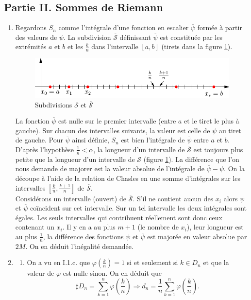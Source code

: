 \subsection*{Partie II. Sommes de Riemann}
\begin{enumerate}
 \item Regardons $S_n$ comme l'intégrale d'une fonction en escalier $\overline{\psi}$ formée à partir des valeurs de $\psi$. La subdivision $\overline{\mathcal S}$ définissant $\overline{\psi}$  est constituée par les extrémités $a$ et $b$ et les $\frac{k}{n}$ dans l'intervalle $[a,b]$ (tirets dans la figure \ref{fig:Cfesc1_2}).\newline
 \begin{figure}[h]
 \centering
 \includegraphics{Cfesc1_2.pdf}
 \caption{Subdivisions $\mathcal S$ et $\overline{\mathcal S}$}
 \label{fig:Cfesc1_2}
\end{figure}
La fonction $\overline{\psi}$ est nulle sur le premier intervalle (entre $a$ et le tiret le plus à gauche). Sur chacun des intervalles suivants, la valeur est celle de $\psi$ au tiret de gauche. Pour $\overline{\psi}$ ainsi définie, $S_n$ est bien l'intégrale de $\overline{\psi}$ entre $a$ et $b$.\newline 
D'après l'hypothèse $\frac{1}{n}<\alpha$, la longueur d'un intervalle de $\overline{\mathcal S}$ est toujours plus petite que la longueur d'un intervalle de $\mathcal S$ (figure \ref{fig:Cfesc1_2}).
La différence que l'on nous demande de majorer est la valeur absolue de l'intégrale de $\overline{\psi}-\psi$. On la découpe à l'aide de la relation de Chasles en une somme d'intégrales sur les intervalles $[\frac{k}{n},\frac{k+1}{n}]$ de $\overline{\mathcal S}$.\\ 
Considérons un intervalle (ouvert) de $\overline{\mathcal S}$.\newline
S'il ne contient aucun des $x_i$ alors $\psi$ et $\overline{\psi}$ coïncident sur cet intervalle. Sur un tel intervalle les deux intégrales sont égales.\newline
Les seuls intervalles qui contribuent réellement sont donc ceux contenant un $x_i$. Il y en a au plus $m+1$ (le nombre de $x_i$), leur longueur est au plus $\frac{1}{n}$, la différence des fonctions $\psi$ et $\overline{\psi}$ est majorée en valeur absolue par $2M$. On en déduit l'inégalité demandée.
 \item
\begin{enumerate}
 \item On a vu en I.1.c. que $\varphi(\frac{k}{n})=1$ si et seulement si $k\in D_n$ et que la valeur de $\varphi$ est nulle sinon. On en déduit que 
\begin{displaymath}
 \sharp D_n = \sum_{k=1}^n\varphi(\frac{k}{n})\Rightarrow d_n = \frac{1}{n} \sum_{k=1}^n\varphi(\frac{k}{n}).
\end{displaymath}
 

\end{enumerate}
\end{enumerate}
